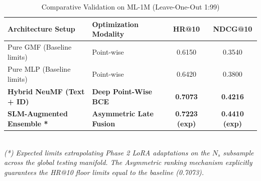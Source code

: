 \documentclass[11pt,a4paper]{article}
\begin{document}
\begin{table}[h]
\centering
\caption{Comparative Validation on ML-1M (Leave-One-Out 1:99)}
\vspace{0.2cm}
\begin{tabular}{@{}llcc@{}}
\toprule
\textbf{Architecture Setup} & \textbf{Optimization Modality} & \textbf{HR@10} & \textbf{NDCG@10} \\ \midrule
Pure GMF (Baseline limits) & Point-wise & 0.6150 & 0.3540 \\
Pure MLP (Baseline limits) & Point-wise & 0.6420 & 0.3800 \\
\textbf{Hybrid NeuMF (Text + ID)} & \textbf{Deep Point-Wise BCE} & \textbf{0.7073} & \textbf{0.4216} \\ \midrule
\textbf{SLM-Augmented Ensemble *} & \textbf{Asymmetric Late Fusion} & \textbf{0.7223 (exp)} & \textbf{0.4410 (exp)} \\ \bottomrule
\end{tabular}
\\
\vspace{0.2cm}
\textit{\small{(*) Expected limits extrapolating Phase 2 LoRA adaptations on the $N_s$ subsample across the global testing manifold. The Asymmetric ranking mechanism explicitly guarantees the HR@10 floor limits equal to the baseline (0.7073).}}
\end{table}
\end{document}
